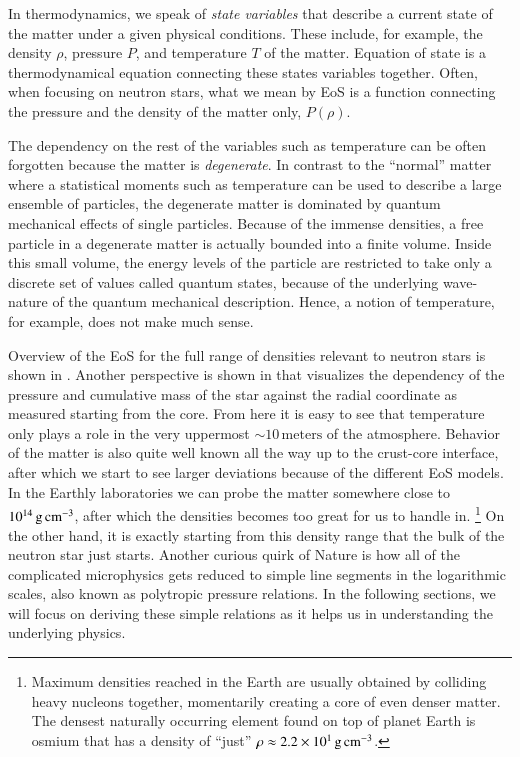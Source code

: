 In thermodynamics, we speak of \emph{state variables} that describe a current state of the matter under a given physical conditions.
These include, for example, the density $\rho$, pressure $P$, and temperature $T$ of the matter.
Equation of state is a thermodynamical equation connecting these states variables together.
Often, when focusing on neutron stars, what we mean by EoS is a function connecting the pressure and the density of the matter only, $P(\rho)$.

The dependency on the rest of the variables such as temperature can be often forgotten because the matter is \emph{degenerate}.%
In contrast to the ``normal'' matter where a statistical moments such as temperature can be used to describe a large ensemble of particles, the degenerate matter is dominated by quantum mechanical effects of single particles.
Because of the immense densities, a free particle in a degenerate matter is actually bounded into a finite volume.
Inside this small volume, the energy levels of the particle are restricted to take only a discrete set of values called quantum states, because of the underlying wave-nature of the quantum mechanical description.
Hence, a notion of temperature, for example, does not make much sense.

Overview of the EoS for the full range of densities relevant to neutron stars is shown in .
Another perspective is shown in  that visualizes the dependency of the pressure and cumulative mass of the star against the radial coordinate as measured starting from the core.
From here it is easy to see that temperature only plays a role in the very uppermost $\sim 10\,\mathrm{meters}$ of the atmosphere.
Behavior of the matter is also quite well known all the way up to the crust-core interface, after which we start to see larger deviations because of the different EoS models.
In the Earthly laboratories we can probe the matter somewhere close to $10^{14} \, \mathrm{g}\,\mathrm{cm}^{-3}$, after which the densities becomes too great for us to handle in.%
\footnote{Maximum densities reached in the Earth are usually obtained by colliding heavy nucleons together, momentarily creating a core of even denser matter.
The densest naturally occurring element found on top of planet Earth is osmium that has a density of ``just'' $\rho \approx 2.2 \times 10^{1}\, \mathrm{g}\,\mathrm{cm}^{-3}$.
}
On the other hand, it is exactly starting from this density range that the bulk of the neutron star just starts.
Another curious quirk of Nature is how all of the complicated microphysics gets reduced to simple line segments in the logarithmic scales, also known as polytropic pressure relations.
In the following sections, we will focus on deriving these simple relations as it helps us in understanding the underlying physics.


